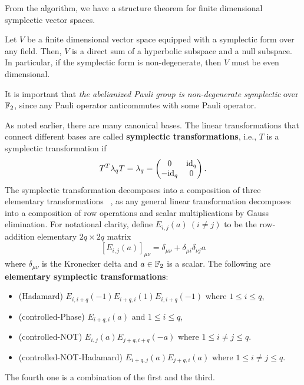 From the algorithm, we have a structure theorem for finite dimensional symplectic vector spaces.
\begin{prop}
Let $V$ be a finite dimensional vector space equipped with a symplectic form over any field.
Then,
$V$ is a direct sum of a hyperbolic subspace and a null subspace.
In particular, if the symplectic form is non-degenerate,
then $V$ must be even dimensional.
\label{prop:structure-symplectic-space}
\end{prop}
\noindent
It is important that \emph{the abelianized Pauli group is non-degenerate symplectic} over $\mathbb{F}_2$,
since any Pauli operator anticommutes with some Pauli operator.

As noted earlier, there are many canonical bases. The linear transformations that connect different bases
are called {\bf symplectic transformations}, i.e., $T$ is a symplectic transformation if
\[
 T^T \lambda_q T = \lambda_q = \begin{pmatrix} 0 & \mathrm{id}_q \\ -\mathrm{id}_q & 0 \end{pmatrix} .
\]
The symplectic transformation decomposes into a composition of three elementary transformations%
~\cite{CalderbankRainsShorEtAl1997Quantum,KitaevShenVyalyi2002CQC},
as any general linear transformation decomposes into a composition of row operations and scalar multiplications
by Gauss elimination.
For notational clarity,
define $E_{i,j}(a)\ (i \neq j)$ to be the row-addition elementary $2q \times 2q$ matrix
\[
 \left[ E_{i,j}(a) \right]_{\mu \nu} = \delta_{\mu \nu} + \delta_{\mu i} \delta_{\nu j} a
\]
where $\delta_{\mu \nu}$ is the Kronecker delta and $a \in \mathbb{F}_2$ is a scalar.
The following are {\bf elementary symplectic transformations}:
\begin{itemize}
 \item (Hadamard) $E_{i,i+q}(-1) E_{i+q,i}(1) E_{i,i+q}(-1)$ where $1 \le i \le q$,
 \item (controlled-Phase) $E_{i+q,i}(a)$ and $1 \le i \le q$,
 \item (controlled-NOT) $E_{i,j}(a) E_{j+q,i+q}(-a)$ where $1 \le i \ne j \le q$.
 \item (controlled-NOT-Hadamard) $E_{i+q,j}(a) E_{j+q,i}(a)$ where $ 1 \le i \ne j \le q$.
\end{itemize}
The fourth one is a combination of the first and the third.

